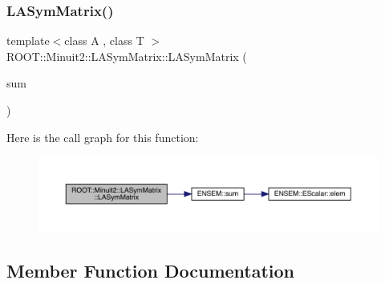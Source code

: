 \subsubsection{\texorpdfstring{LASymMatrix()}{LASymMatrix()}\hspace{0.1cm}{\footnotesize\ttfamily [30/30]}}
{\footnotesize\ttfamily template$<$class A , class T $>$ \\
R\+O\+O\+T\+::\+Minuit2\+::\+L\+A\+Sym\+Matrix\+::\+L\+A\+Sym\+Matrix (\begin{DoxyParamCaption}\item[{const \mbox{\hyperlink{classROOT_1_1Minuit2_1_1ABObj}{A\+B\+Obj}}$<$ \mbox{\hyperlink{classROOT_1_1Minuit2_1_1sym}{sym}}, \mbox{\hyperlink{classROOT_1_1Minuit2_1_1ABSum}{A\+B\+Sum}}$<$ \mbox{\hyperlink{classROOT_1_1Minuit2_1_1ABObj}{A\+B\+Obj}}$<$ \mbox{\hyperlink{classROOT_1_1Minuit2_1_1sym}{sym}}, \mbox{\hyperlink{classROOT_1_1Minuit2_1_1VectorOuterProduct}{Vector\+Outer\+Product}}$<$ \mbox{\hyperlink{classROOT_1_1Minuit2_1_1ABObj}{A\+B\+Obj}}$<$ \mbox{\hyperlink{classROOT_1_1Minuit2_1_1vec}{vec}}, \mbox{\hyperlink{classROOT_1_1Minuit2_1_1LAVector}{L\+A\+Vector}}, T $>$, T $>$, T $>$, \mbox{\hyperlink{classROOT_1_1Minuit2_1_1ABObj}{A\+B\+Obj}}$<$ \mbox{\hyperlink{classROOT_1_1Minuit2_1_1sym}{sym}}, A, T $>$ $>$, T $>$ \&}]{sum }\end{DoxyParamCaption})\hspace{0.3cm}{\ttfamily [inline]}}

Here is the call graph for this function\+:
\nopagebreak
\begin{figure}[H]
\begin{center}
\leavevmode
\includegraphics[width=350pt]{d3/d72/classROOT_1_1Minuit2_1_1LASymMatrix_aed0e1071ce94c05d4b18e7594db9a249_cgraph}
\end{center}
\end{figure}


\subsection{Member Function Documentation}
\mbox{\label{classROOT_1_1Minuit2_1_1LASymMatrix_ab1fb932a4ad517108a3b58473b6d8803}} 

